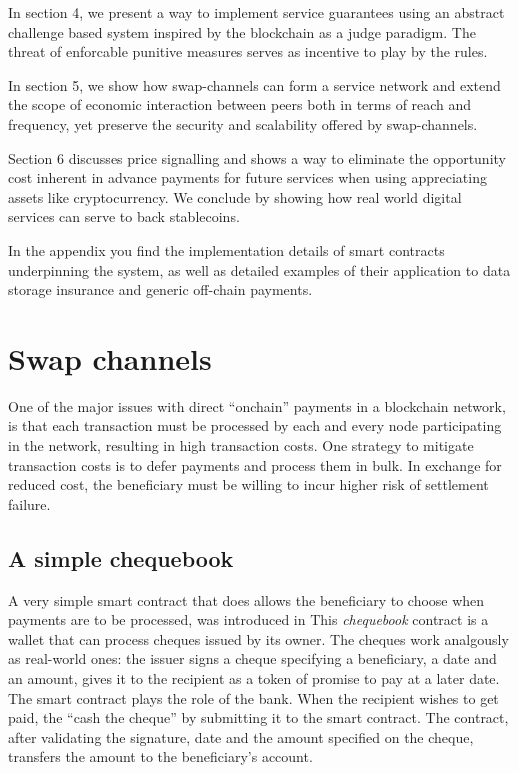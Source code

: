 \documentclass[a4paper,10pt]{article}
\newcommand\gloss[1]{\emph{\gls{#1}}}
\begin{document}
In section 4, we present a way to implement service guarantees using an abstract
challenge based system inspired by the blockchain as a judge paradigm. The threat
of enforcable punitive measures serves as incentive to play by the rules.

In section 5, we show how swap-channels can form a service network and extend the
scope of economic interaction between peers both in terms of reach and frequency, yet
preserve the security and scalability offered by swap-channels.

Section 6 discusses price signalling and shows a way to eliminate the opportunity cost
inherent in advance payments for future services when using appreciating assets like cryptocurrency.
We conclude by showing how real world digital services can serve to back stablecoins.

In the appendix you find the implementation details of smart contracts underpinning the
system, as well as detailed examples of their application to data storage insurance and
generic off-chain payments.

\section{Swap channels}

One of the major issues with direct ``onchain'' payments in a blockchain network, is that each transaction must be processed
by each and every node participating in the network, resulting in high transaction costs.
One strategy to mitigate transaction costs is to defer payments and process them in bulk. 
In exchange for reduced cost, the beneficiary must be willing to incur higher risk of settlement failure.

\subsection{A simple chequebook}

A very simple smart contract that does allows the beneficiary to choose when payments are to be processed, was introduced in \cite{ethersphere2016sw3}
This \gloss{chequebook} contract is a wallet that can process cheques issued by its owner. The cheques work
analgously as real-world ones: the issuer signs a cheque specifying a beneficiary, a date and an amount,
gives it to the recipient as a token of promise to pay at a later date. The smart contract plays the
role of the bank. When the recipient wishes to get paid, the ``cash the cheque'' by submitting it to the smart contract. The contract, after validating the signature, date and the amount specified on the cheque, transfers the amount to the beneficiary's account.
\end{document}
